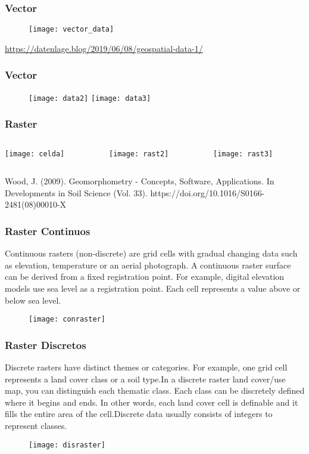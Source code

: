 \documentclass[14pt]{beamer}
\begin{document}
\begin{frame}
\frametitle{Vector}
  \begin{figure}
    \centering
    \texttt{[image: vector\_data]}
  \end{figure}
\tiny{\url{https://datenlage.blog/2019/06/08/geospatial-data-1/}}
\end{frame}
\begin{frame}
\frametitle{Vector}
  \begin{figure}
    \centering
    \texttt{[image: data2]}
    \texttt{[image: data3]}
  \end{figure}
\end{frame}
\begin{frame}
\frametitle{Raster}
  \begin{columns}
		\begin{column}{.33\linewidth}
		 \texttt{[image: celda]}
		\end{column}
		\begin{column}{.33\linewidth}
			 \texttt{[image: rast2]}
		\end{column}
		\begin{column}{.33\linewidth}
			 \texttt{[image: rast3]}
		\end{column}
	\end{columns}\vfill
\tiny{Wood, J. (2009). Geomorphometry - Concepts, Software, Applications. In Developments in Soil Science (Vol. 33). https://doi.org/10.1016/S0166-2481(08)00010-X}
\end{frame}
\begin{frame}
\frametitle{Raster Continuos}
\scriptsize{Continuous rasters (non-discrete) are grid cells with gradual changing data such as elevation, temperature or an aerial photograph. A continuous raster surface can be derived from a fixed registration point. For example, digital elevation models use sea level as a registration point. Each cell represents a value above or below sea level.}
  \begin{figure}
    \centering
    \texttt{[image: conraster]}
  \end{figure}
\end{frame}
\begin{frame}
\frametitle{Raster Discretos}
\scriptsize{Discrete rasters have distinct themes or categories. For example, one grid cell represents a land cover class or a soil type.In a discrete raster land cover/use map, you can distinguish each thematic class. Each class can be discretely defined where it begins and ends. In other words, each land cover cell is definable and it fills the entire area of the cell.Discrete data usually consists of integers to represent classes.}
  \begin{figure}
    \centering
    \texttt{[image: disraster]}
  \end{figure}
\end{frame}
\end{document}
